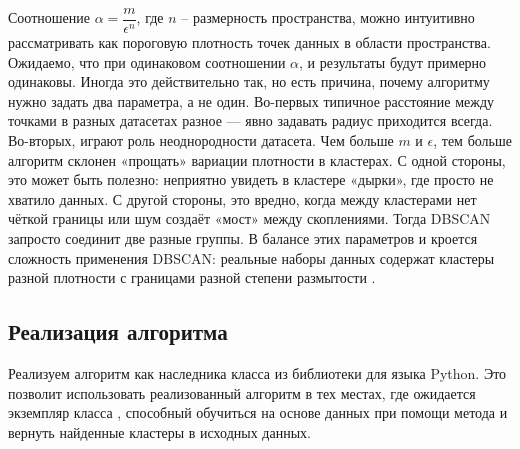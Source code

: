 Соотношение $\alpha = \dfrac{m}{\epsilon^n}$, где $n$ -- размерность пространства, можно интуитивно рассматривать как пороговую плотность точек данных в области пространства. Ожидаемо, что при одинаковом соотношении $\alpha$, и результаты будут примерно одинаковы. Иногда это действительно так, но есть причина, почему алгоритму нужно задать два параметра, а не один. Во-первых типичное расстояние между точками в разных датасетах разное — явно задавать радиус приходится всегда. Во-вторых, играют роль неоднородности датасета. Чем больше $m$ и $\epsilon$, тем больше алгоритм склонен «прощать» вариации плотности в кластерах. С одной стороны, это может быть полезно: неприятно увидеть в кластере «дырки», где просто не хватило данных. С другой стороны, это вредно, когда между кластерами нет чёткой границы или шум создаёт «мост» между скоплениями. Тогда DBSCAN запросто соединит две разные группы. В балансе этих параметров и кроется сложность применения DBSCAN: реальные наборы данных содержат кластеры разной плотности с границами разной степени размытости \cite{habr}.

\subsection{Реализация алгоритма}

Реализуем алгоритм как наследника класса  из библиотеки  для языка Python. Это позволит использовать реализованный алгоритм в тех местах, где ожидается экземпляр класса , способный обучиться на основе данных при помощи метода  и вернуть найденные кластеры в исходных данных.

\newpage

